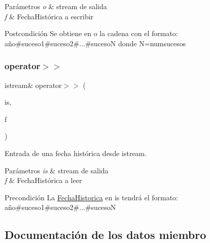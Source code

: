 \begin{DoxyParams}{Parámetros}
{\em o} & stream de salida \\
\hline
{\em f} & Fecha\+Histórica a escribir \\
\hline
\end{DoxyParams}
\begin{DoxyPostcond}{Postcondición}
Se obtiene en o la cadena con el formato\+: año\#suceso1\#suceso2\#...\#sucesoN donde N=numsucesos 
\end{DoxyPostcond}
\mbox{\label{classFechaHistorica_a25a93d162aadd3c52aa1f3d1831e3d75}} 
\subsubsection{\texorpdfstring{operator$>$$>$}{operator>>}}
{\footnotesize\ttfamily istream\& operator$>$$>$ (\begin{DoxyParamCaption}\item[{istream \&}]{is,  }\item[{\hyperlink{classFechaHistorica}{Fecha\+Historica} \&}]{f }\end{DoxyParamCaption})\hspace{0.3cm}{\ttfamily [friend]}}



Entrada de una fecha histórica desde istream. 


\begin{DoxyParams}{Parámetros}
{\em is} & stream de salida \\
\hline
{\em f} & Fecha\+Histórica a leer \\
\hline
\end{DoxyParams}
\begin{DoxyPrecond}{Precondición}
La \hyperlink{classFechaHistorica}{Fecha\+Historica} en is tendrá el formato\+: año\#suceso1\#suceso2\#...\#sucesoN 
\end{DoxyPrecond}


\subsection{Documentación de los datos miembro}
\mbox{\label{classFechaHistorica_ade873215978862ec3ca4fcaa1fd33a07}} 
